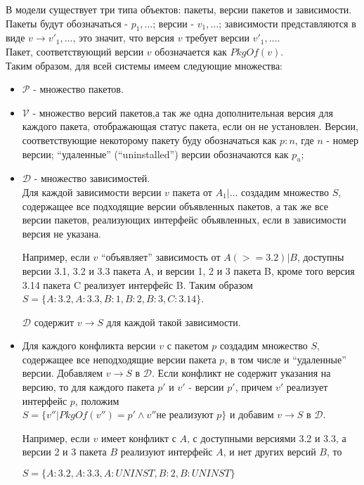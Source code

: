 В модели\cite{dependencies_model} существует три типа объектов: пакеты, версии пакетов и зависимости.
Пакеты будут обозначаться - $p_1, \dots$; версии - $v_1, \dots$; зависимости 
представляются в виде $v \to {v'_1, \dots}$, это значит, что версия $v$ требует
версии ${v'_1, \dots}$. \\
Пакет, соответствующий версии $v$ обозначается как $PkgOf(v)$.\\
Таким образом, для всей системы имеем следующие множества:
\begin{itemize}
\item{
$\mathcal{P}$ - множество пакетов.
}
\item{
$\mathcal{V}$ - множество версий пакетов,а так же одна дополнительная версия для каждого пакета,
отображающая статус пакета, если он не установлен. Версии, соответствующие некоторому пакету
буду обозначаться как $p: n$, где $n$ - номер версии; ``удаленные'' (``uninstalled'') версии
обозначаются как $p_u$;
}
\item{
$\mathcal{D}$ - множество зависимостей.\\
 Для каждой зависимости версии $v$ пакета от $A_1 | \dots$
создадим множество $S$, содержащее все подходящие версии объявленных пакетов, 
а так же все версии пакетов, реализующих интерфейс объявленных, если в зависимости 
версия не указана.

Например, если $v$ ``объявляет'' зависимость от $A (>= 3.2) | B$, 
доступны версии 3.1, 3.2 и 3.3 пакета A, и версии 1, 2 и 3 пакета B,
кроме того версия 3.14 пакета C реализует интерфейс B. 
Таким образом $S = \{A:3.2,A:3.3,B:1,B:2,B:3,C:3.14\} $. 

$\mathcal{D}$ содержит $v \to S$ для каждой такой зависимости.
}
\item{
Для каждого конфликта версии $v$ с пакетом $p$ создадим множество $S$, содержащее все
неподходящие версии пакета $p$, в том числе и ``удаленные'' версии. Добавляем $v \to S$
в $\mathcal{D}$. Если конфликт не содержит указания на версию, то для каждого пакета $p'$ и $v'$ -
версии $p'$, причем $v'$ реализует интерфейс $p$, положим \\
$S = \{v''|PkgOf(v'') = p' \wedge v'' \text{не реализуют $p$}\} $
и добавим $v \to S$ в $\mathcal{D}$.

Например, если $v$ имеет конфликт с $A$, с доступными версиями 3.2 и 3.3, а версии 2 и 3 пакета $B$
реализуют интерфейс $A$, и нет других версий $B$, то

$S = \{A:3.2, A:3.3, A:UNINST, B:2, B:UNINST\}$
}
\end{itemize}

